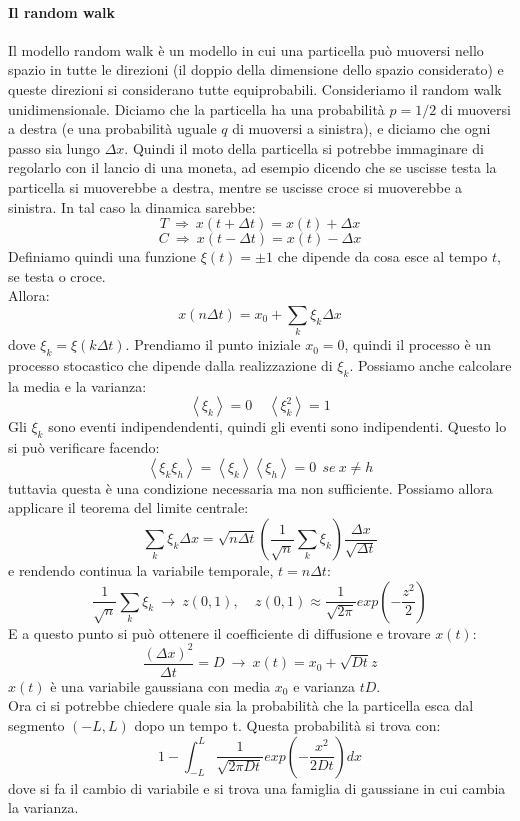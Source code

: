 \documentclass[12pt]{article}
\newcommand{\lang}{\left\langle}
\newcommand{\rang}{\right\rangle}
\begin{document}
\paragraph*{Il random walk \\}
Il modello random walk è un modello in cui una particella può muoversi nello spazio in tutte le direzioni (il doppio della dimensione dello spazio considerato) e queste direzioni si considerano tutte equiprobabili.
Consideriamo il random walk unidimensionale. Diciamo che la particella ha una probabilità $p = 1/2$ di muoversi a destra (e una probabilità uguale $q$ di muoversi a sinistra), e diciamo che ogni passo sia lungo $\Delta x$. Quindi il moto della particella si potrebbe immaginare di regolarlo con il lancio di una moneta, ad esempio dicendo che se uscisse testa la particella si muoverebbe a destra, mentre se uscisse croce si muoverebbe a sinistra. In tal caso la dinamica sarebbe:
$$
	T \ \Longrightarrow \ x(t + \Delta t) = x(t) + \Delta x
$$ 
$$
	C \ \Longrightarrow \ x(t - \Delta t) = x(t) - \Delta x
$$
Definiamo quindi una funzione $\xi(t) = \pm 1$ che dipende da cosa esce al tempo $t$, se testa o croce. \\
Allora:
$$
	x(n\Delta t) = x_0 + \sum_k \xi_k \Delta x
$$
dove $\xi_k = \xi(k\Delta t)$. Prendiamo il punto iniziale $x_0 = 0$, quindi il processo è un processo stocastico che dipende dalla realizzazione di $\xi_k$. Possiamo anche calcolare la media e la varianza:
$$
	\lang \xi_k\rang = 0 \ \ \ \ \ \lang \xi_k^2 \rang = 1
$$ 
Gli $\xi_k$ sono eventi indipendendenti, quindi gli eventi sono indipendenti. Questo lo si può verificare facendo:
$$
	\lang \xi_k\xi_h \rang = \lang \xi_k \rang \lang \xi_h \rang = 0 \ \ se \ x \neq h
$$
tuttavia questa è una condizione necessaria ma non sufficiente. 
Possiamo allora applicare il teorema del limite centrale:
$$
	\sum_k \xi_k \Delta x = \sqrt{n\Delta t} \left( \frac{1}{\sqrt{n}} \sum_k \xi_k \right) \frac{\Delta x}{\sqrt{\Delta t}}
$$
e rendendo continua la variabile temporale, $t = n \Delta t$:
$$
	\frac{1}{\sqrt{n}}\sum_k \xi_k \ \longrightarrow \ z(0,1), \ \ \ \ \ z(0,1) \approx \frac{1}{\sqrt{2\pi}} exp\left(-\frac{z^2}{2} \right) 
$$
E a questo punto si può ottenere il coefficiente di diffusione e trovare $x(t)$:
\begin{equation}
	\frac{(\Delta x)^2}{\Delta t} = D \ \longrightarrow \ x(t) = x_0 + \sqrt{Dt}z
\end{equation}
$x(t)$ è una variabile gaussiana con media $x_0$ e varianza $tD$. \\
Ora ci si potrebbe chiedere quale sia la probabilità che la particella esca dal segmento $(-L,L)$ dopo un tempo t. Questa probabilità si trova con:
$$
	1 - \int_{-L}^L \frac{1}{\sqrt{2\pi D t}}exp \left(-\frac{x^2}{2Dt} \right) dx
$$
dove si fa il cambio di variabile e si trova una famiglia di gaussiane in cui cambia la varianza.
\end{document}
